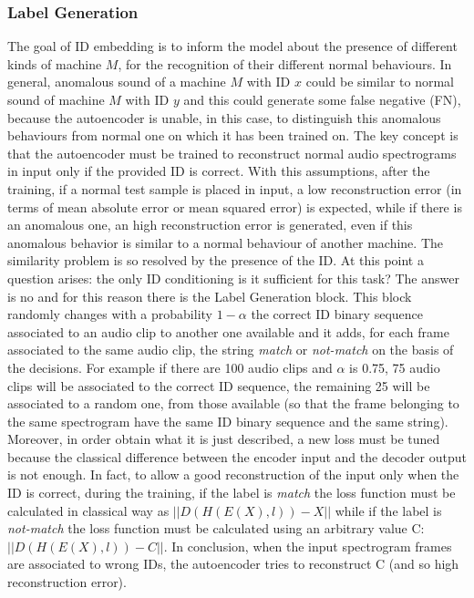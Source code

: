 \subsubsection{Label Generation}
The goal of ID embedding is to inform the model about the presence of different kinds of machine $M$, for the recognition of their different normal behaviours. In general, anomalous sound of a machine $M$ with ID $x$ could be similar to normal sound of machine $M$ with ID $y$ and this could generate some false negative (FN), because the autoencoder is unable, in this case, to distinguish this anomalous behaviours from normal one on which it has been trained on. The key concept is that the autoencoder must be trained to reconstruct normal audio spectrograms in input only if the provided ID is correct. With this assumptions, after the training, if a normal test sample is placed in input, a low reconstruction error (in terms of mean absolute error or mean squared error) is expected, while if there is an anomalous one, an high  reconstruction error is generated, even if this anomalous behavior is similar to a normal behaviour of another machine. The similarity problem is so resolved by the presence of the ID. At this point a question arises: the only ID conditioning is it sufficient for this task? The answer is no and for this reason there is the Label Generation block. This block randomly changes with a probability $1-\alpha$ the correct ID binary sequence associated to an audio clip to another one available and it adds, for each frame associated to the same audio clip, the string \textit{match} or \textit{not-match} on the basis of the decisions. For example if there are 100 audio clips and $\alpha$ is 0.75, 75 audio clips will be associated to the correct ID sequence, the remaining 25 will be associated to a random one, from those available (so that the frame belonging to the same spectrogram have the same ID binary sequence and the same string). Moreover, in order obtain what it is just described, a new loss must be tuned because the classical difference between the encoder input and the decoder output is not enough. In fact, to allow a good reconstruction of the input only when the ID is correct, during the training, if the label is \textit{match} the loss function must be calculated in classical way as $||D(H(E(X),l)) - X||$
while if the label is \textit{not-match} the loss function must be calculated using an arbitrary value C: $||D(H(E(X),l)) - C||$.
In conclusion, when the input spectrogram frames are associated to wrong IDs, the autoencoder tries to reconstruct C (and so high reconstruction error).
